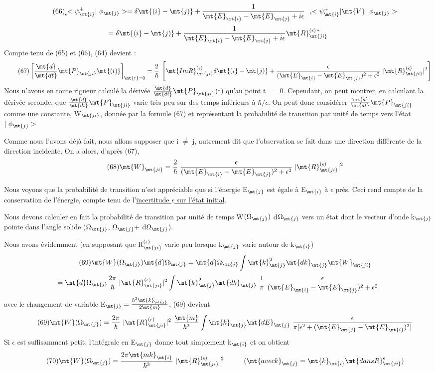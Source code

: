 \[
\tag{66}_\epsilon\!\!<\psi^+_\mt{i }|\ \phi_\mt{j}>=\delta\mt{(i}-\mt{j)}+
\frac{1}{\mt{E}_\mt{i}-\mt{E}_\mt{j}+i\epsilon}{\ \ }_\epsilon\!\!<\psi^+_\mt{i }|\mt{ V }|\ \phi_\mt{j}>
\]
\[
=\delta\mt{(i}-\mt{j)}+
\frac{1}{\mt{E}_\mt{i}-\mt{E}_\mt{j}+i\epsilon}\mt{ R}_\mt{ji}^{(\epsilon)\,*}
\]
Compte tenu de (65) et (66), (64) devient :
\[
\tag{67}\left[\frac{\mt{d}}{\mt{dt}}\mt{P}_\mt{ji}\mt{(t)}\right]_{\mt{t}=0}=\frac{2}{\hbar}\;\left[
\mt{Im R}_\mt{ji}^{(\epsilon)}\delta\mt{(i}-\mt{j)}+\frac{\epsilon}{(\mt{E}_\mt{i}-\mt{E}_\mt{j})^2+\epsilon^2}\;
|\mt{R}_\mt{ji}^{(\epsilon)}|^2\right]
\]
Nous n'avons en toute rigueur calculé la dérivée $\frac{\mt{d}}{\mt{dt}}\mt{P}_\mt{ji}$(t) qu'au point
t $=$ 0. Cependant, on peut montrer, en calculant la dérivée seconde, que
$\frac{\mt{d}}{\mt{dt}}\mt{P}_\mt{ji}$
varie très peu sur des temps inférieurs à $\hbar/\epsilon$. On peut donc considérer
$\frac{\mt{d}}{\mt{dt}}\mt{P}_\mt{ji}$
comme une constante, W$_\mt{ji}$, donnée par la formule (67)
et représentant la probabilité de transition par unité de temps vers
l'état $|\ \phi_\mt{j}>$

Comme nous l'avons déjà fait, nous allons supposer que i $\neq$ j,
autrement dit que l'observation se fait dans une direction différente de
la direction incidente. On a alors, d'après (67),
\[
\tag{68}\mt{W}_\mt{ji}=
\frac{2}{\hbar}\;\frac{\epsilon}{(\mt{E}_\mt{i}-\mt{E}_\mt{j})^2+\epsilon^2}\;
|\mt{R}_\mt{ji}^{(\epsilon)}|^2
\]

Nous voyons que la probabilité de transition n'est appréciable
que si l'énergie E$_\mt{j}$ est égale à E$_\mt{i}$ à $\epsilon$ près. Ceci rend compte de la conservation
de l'énergie, compte tenu de l'\ul{incertitude $\epsilon$ sur l'état initial}.

Nous devons calculer en fait la probabilité de transition par
unité de temps W$(\Omega_\mt{j})$ d$\Omega_\mt{j}$ vers un état dont le vecteur d'onde k$_\mt{j}$ pointe
dans l'angle solide ($\Omega_\mt{j}$, $\Omega_\mt{j }+$ d$\Omega_\mt{j}$).

Nous avons évidemment (en supposant que R$_\mt{ji}^{(\epsilon)}$ varie peu lorsque
k$_\mt{j}$ varie autour de k$_\mt{i}$)
\[
\tag{69}\mt{W}(\Omega_\mt{j})\mt{ d}\Omega_\mt{j }=
\mt{ d}\Omega_\mt{j}\int\mt{k}_\mt{j}^2\mt{ dk}_\mt{j}\mt{ W}_\mt{ji}
\]
\[
=\mt{ d}\Omega_\mt{j }\frac{2\pi}{\hbar}\;|\mt{R}_\mt{ji}^{(\epsilon)}|^2\int\mt{k}_\mt{j}^2
\mt{ dk}_\mt{j}\;\frac{1}{\pi}\;\frac{\epsilon}{(\mt{E}_\mt{i}-\mt{E}_\mt{j})^2+\epsilon^2}
\]
avec le changement de variable E$_\mt{j}=\frac{\hbar^2\mt{k}_\mt{j}}{2\mt{m}}$,
(69) devient
\[
\tag{69}\mt{W}(\Omega_\mt{j})=\frac{2\pi}{\hbar}\ |\mt{R}_\mt{ji}^{(\epsilon)}|^2\ \frac{\mt{m}}{\hbar^2}
\int\mt{k}_\mt{j}
\mt{ dE}_\mt{j}\ \frac{\epsilon}{\pi[\epsilon^2+(\mt{E}_\mt{j}-\mt{E}_\mt{i})^2]}
\]
Si $\epsilon$ est suffisamment petit, l'intégrale en E$_\mt{j}$ donne tout simplement k$_\mt{i}$
et on obtient
\[
\tag{70}\mt{W}(\Omega_\mt{j})=\frac{2\pi\mt{ m k}_\mt{i}}{\hbar^3}\ |\mt{R}_\mt{ji}^{(\epsilon)}|^2
\hspace{1cm} (\mt{avec k}_\mt{j}=\mt{k}_\mt{i}\mt{ dans R}_\mt{ji}^\epsilon)
\]
